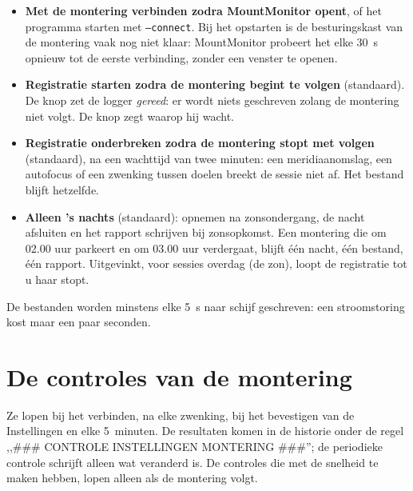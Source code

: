 \begin{itemize}
  \item \textbf{Met de montering verbinden zodra MountMonitor opent}, of het
  programma starten met \texttt{--connect}. Bij het opstarten is de
  besturingskast van de montering vaak nog niet klaar: MountMonitor probeert het
  elke 30~s opnieuw tot de eerste verbinding, zonder een venster te openen.
  \item \textbf{Registratie starten zodra de montering begint te volgen}
  (standaard). De knop zet de logger \emph{gereed}: er wordt niets geschreven
  zolang de montering niet volgt. De knop zegt waarop hij wacht.
  \item \textbf{Registratie onderbreken zodra de montering stopt met volgen}
  (standaard), na een wachttijd van twee minuten: een meridiaanomslag, een
  autofocus of een zwenking tussen doelen breekt de sessie niet af. Het bestand
  blijft hetzelfde.
  \item \textbf{Alleen 's nachts} (standaard): opnemen na zonsondergang, de
  nacht afsluiten en het rapport schrijven bij zonsopkomst. Een montering die om
  02.00 uur parkeert en om 03.00 uur verdergaat, blijft één nacht, één bestand,
  één rapport. Uitgevinkt, voor sessies overdag (de zon), loopt de registratie
  tot u haar stopt.
\end{itemize}

De bestanden worden minstens elke 5~s naar schijf geschreven: een stroomstoring
kost maar een paar seconden.

\chapter{De controles van de montering}
\label{ch:checks}

Ze lopen bij het verbinden, na elke zwenking, bij het bevestigen van de
Instellingen en elke 5~minuten. De resultaten komen in de historie onder de regel
,,\#\#\# CONTROLE INSTELLINGEN MONTERING \#\#\#''; de periodieke controle
schrijft alleen wat veranderd is. De controles die met de snelheid te maken
hebben, lopen alleen als de montering volgt.

